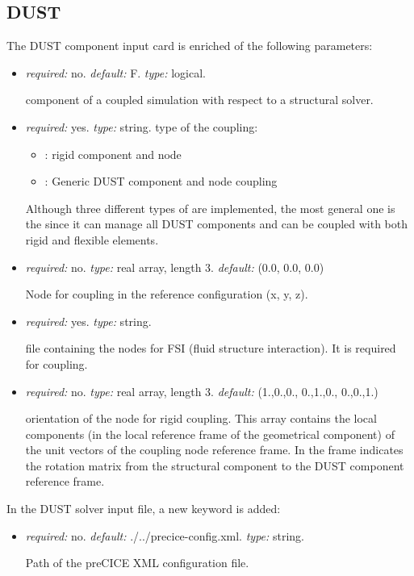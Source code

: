 \subsection{DUST}
\label{subsec:DUSTpreCICE}
The DUST component input card is enriched of the following parameters:
\begin{itemize}
    \item {} \textit{required:} no. \textit{default:} F. \textit{type:} logical.
    
    component of a coupled simulation with respect to a structural solver.
    
    \item {} \textit{required:} yes. \textit{type:} string. 
    type of the coupling:
    \begin{itemize}
        \item {}: rigid component and node 
        \item {}: Generic DUST component and node coupling
    \end{itemize}
    Although three different types of are implemented, the most general one is the  since it can manage all DUST components and can be coupled with both rigid and flexible elements.  
   
   \item {} \textit{required:} no. \textit{type:} real array, length 3. \textit{default:} (0.0, 0.0, 0.0)
   
   Node for  coupling in the reference configuration (x, y, z).
   
   \item {} \textit{required:} yes. \textit{type:} string. 
   
   file containing the nodes for FSI (fluid structure interaction). It is required for  coupling. 
   
   \item {} \textit{required:} no. \textit{type:} real array, length 3. \textit{default:} (1.,0.,0., 0.,1.,0., 0.,0.,1.)
   
   orientation of the node for rigid coupling. This array contains the local components (in the local reference frame of the geometrical           component) of the unit vectors of the coupling node reference frame. In the  frame indicates the rotation matrix from the structural component to the DUST component reference frame. 
   
\end{itemize}
In the DUST solver input file, a new keyword is added:
\begin{itemize}
    \item {} \textit{required:} no. \textit{default:} ./../precice-config.xml. \textit{type:} string.
    
    Path of the preCICE XML configuration file.
\end{itemize}
